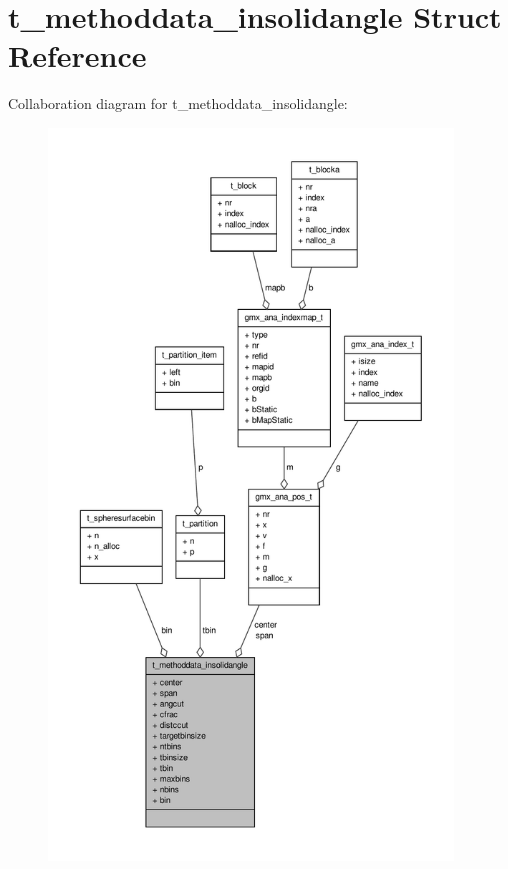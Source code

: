 \hypertarget{structt__methoddata__insolidangle}{\section{t\-\_\-methoddata\-\_\-insolidangle \-Struct \-Reference}
\label{structt__methoddata__insolidangle}
}


\-Collaboration diagram for t\-\_\-methoddata\-\_\-insolidangle\-:
\nopagebreak
\begin{figure}[H]
\begin{center}
\leavevmode
\includegraphics[height=550pt]{structt__methoddata__insolidangle__coll__graph}
\end{center}
\end{figure}
